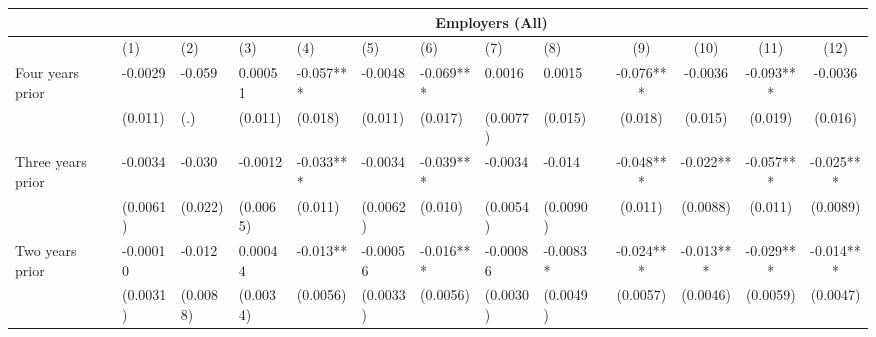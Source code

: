 \begin{tabular}{lccccrrrrrcccc}
\toprule
      & \multicolumn{13}{c}{Employers (All)} \\
\midrule
      & \multicolumn{1}{l}{(1)} & \multicolumn{1}{l}{(2)} & \multicolumn{1}{l}{(3)} & \multicolumn{1}{l}{(4)} & \multicolumn{1}{l}{(5)} & \multicolumn{1}{l}{(6)} & \multicolumn{1}{l}{(7)} & \multicolumn{1}{l}{(8)} &       & (9)   & (10)  & (11)  & (12) \\
\midrule
\midrule
Four years prior & \multicolumn{1}{l}{-0.0029} & \multicolumn{1}{l}{-0.059} & \multicolumn{1}{l}{0.00051} & \multicolumn{1}{l}{-0.057***} & \multicolumn{1}{l}{-0.0048} & \multicolumn{1}{l}{-0.069***} & \multicolumn{1}{l}{0.0016} & \multicolumn{1}{l}{0.0015} &       & -0.076*** & -0.0036 & -0.093*** & -0.0036 \\
      & \multicolumn{1}{l}{(0.011)} & \multicolumn{1}{l}{(.)} & \multicolumn{1}{l}{(0.011)} & \multicolumn{1}{l}{(0.018)} & \multicolumn{1}{l}{(0.011)} & \multicolumn{1}{l}{(0.017)} & \multicolumn{1}{l}{(0.0077)} & \multicolumn{1}{l}{(0.015)} &       & (0.018) & (0.015) & (0.019) & (0.016) \\
Three years prior & \multicolumn{1}{l}{-0.0034} & \multicolumn{1}{l}{-0.030} & \multicolumn{1}{l}{-0.0012} & \multicolumn{1}{l}{-0.033***} & \multicolumn{1}{l}{-0.0034} & \multicolumn{1}{l}{-0.039***} & \multicolumn{1}{l}{-0.0034} & \multicolumn{1}{l}{-0.014} &       & -0.048*** & -0.022** & -0.057*** & -0.025*** \\
      & \multicolumn{1}{l}{(0.0061)} & \multicolumn{1}{l}{(0.022)} & \multicolumn{1}{l}{(0.0065)} & \multicolumn{1}{l}{(0.011)} & \multicolumn{1}{l}{(0.0062)} & \multicolumn{1}{l}{(0.010)} & \multicolumn{1}{l}{(0.0054)} & \multicolumn{1}{l}{(0.0090)} &       & (0.011) & (0.0088) & (0.011) & (0.0089) \\
Two years prior & \multicolumn{1}{l}{-0.00010} & \multicolumn{1}{l}{-0.012} & \multicolumn{1}{l}{0.00044} & \multicolumn{1}{l}{-0.013**} & \multicolumn{1}{l}{-0.00056} & \multicolumn{1}{l}{-0.016***} & \multicolumn{1}{l}{-0.00086} & \multicolumn{1}{l}{-0.0083*} &       & -0.024*** & -0.013*** & -0.029*** & -0.014*** \\
      & \multicolumn{1}{l}{(0.0031)} & \multicolumn{1}{l}{(0.0088)} & \multicolumn{1}{l}{(0.0034)} & \multicolumn{1}{l}{(0.0056)} & \multicolumn{1}{l}{(0.0033)} & \multicolumn{1}{l}{(0.0056)} & \multicolumn{1}{l}{(0.0030)} & \multicolumn{1}{l}{(0.0049)} &       & (0.0057) & (0.0046) & (0.0059) & (0.0047) \\

\end{tabular}
